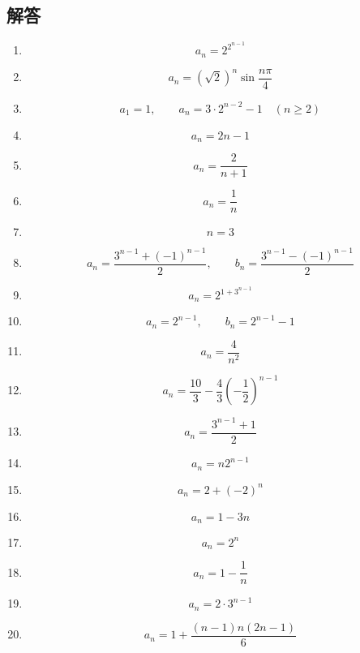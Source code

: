     \subsection{解答}\label{節：基本と応用から出題されるもの：解答}
      \begin{enumerate}[label=\textbf{問\arabic*.},leftmargin=3.8em,format=\bookitemlink{practice-basic}{answer}{problem}]
        \item \[
            a_n=2^{2^{n-1}}
          \]
        \item \[
            a_n=(\sqrt2)^n\sin\frac{n\pi}{4}
          \]
        \item \[
            a_1=1,\qquad
            a_n=3\cdot2^{n-2}-1\quad(n\ge2)
          \]
        \item \[
            a_n=2n-1
          \]
        \item \[
            a_n=\frac{2}{n+1}
          \]
        \item \[
            a_n=\frac1n
          \]
        \item \[
            n=3
          \]
        \item \[
            a_n=
            \frac{3^{n-1}+(-1)^{n-1}}2,
            \qquad
            b_n=
            \frac{3^{n-1}-(-1)^{n-1}}2
          \]
        \item \[
            a_n=2^{1+3^{n-1}}
          \]
        \item \[
            a_n=2^{n-1},
            \qquad
            b_n=2^{n-1}-1
          \]
        \item \[
            a_n=\frac4{n^2}
          \]
        \item \[
            a_n=
            \frac{10}{3}
            -\frac43\left(-\frac12\right)^{n-1}
          \]
        \item \[
            a_n=\frac{3^{n-1}+1}{2}
          \]
        \item \[
            a_n=n2^{n-1}
          \]
        \item \[
            a_n=2+(-2)^n
          \]
        \item \[
            a_n=1-3n
          \]
        \item \[
            a_n=2^n
          \]
        \item \[
            a_n=1-\frac1n
          \]
        \item \[
            a_n=2\cdot3^{n-1}
          \]
        \item \[
            a_n
            =1+\frac{(n-1)n(2n-1)}6
          \]

\end{enumerate}
